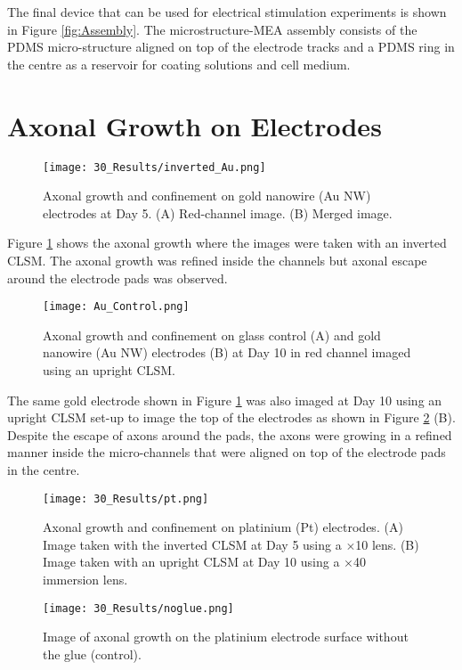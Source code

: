 The final device that can be used for electrical stimulation experiments is shown in Figure \ref{fig:Assembly}. The microstructure-MEA assembly consists of the PDMS micro-structure aligned on top of the electrode tracks and a PDMS ring in the centre as a reservoir for coating solutions and cell medium. 

\section{Axonal Growth on Electrodes}

\begin{figure}[H]
\centering
\texttt{[image: 30\_Results/inverted\_Au.png]}
\caption{Axonal growth and confinement on gold nanowire (Au NW) electrodes at Day 5. (A) Red-channel image. (B) Merged image.}
\label{fig:inverted}
\end{figure}

Figure \ref{fig:inverted} shows the axonal growth where the images were taken with an inverted CLSM. The axonal growth was refined inside the channels but axonal escape around the electrode pads was observed.

\begin{figure}[H]
\centering
\texttt{[image: Au\_Control.png]}
\caption{Axonal growth and confinement on glass control (A) and gold nanowire (Au NW) electrodes (B) at Day 10 in red channel imaged using an upright CLSM.}
\label{fig:upright}
\end{figure}
The same gold electrode shown in
Figure \ref{fig:inverted} was also imaged at Day 10 using an upright CLSM set-up to image the top of the electrodes as shown in Figure \ref{fig:upright} (B). Despite the escape of axons around the pads, the axons were growing in a refined manner inside the micro-channels that were aligned on top of the electrode pads in the centre. 



\begin{figure}[H]
\centering
\texttt{[image: 30\_Results/pt.png]}
\caption{Axonal growth and confinement on platinium (Pt) electrodes. (A) Image taken with the inverted CLSM at Day 5 using a $\times$10 lens. (B) Image taken with an upright CLSM at Day 10 using a $\times$40 immersion lens.}
\label{fig:pt}
\end{figure}

\begin{figure}[H]
\centering
\texttt{[image: 30\_Results/noglue.png]}
\caption{Image of axonal growth on the platinium  electrode surface without the glue (control).}
\label{fig:noglue}
\end{figure}

